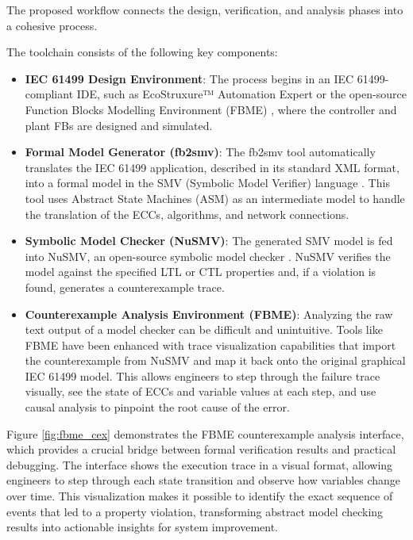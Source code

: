 The proposed workflow connects the design, verification, and analysis phases into a cohesive process.

The toolchain consists of the following key components:

\begin{itemize}
\item \textbf{IEC 61499 Design Environment}: The process begins in an IEC 61499-compliant IDE, such as EcoStruxure™ Automation Expert or the open-source Function Blocks Modelling Environment (FBME) \cite{fbme}, where the controller and plant FBs are designed and simulated.

\item \textbf{Formal Model Generator (fb2smv)}: The fb2smv tool automatically translates the IEC 61499 application, described in its standard XML format, into a formal model in the SMV (Symbolic Model Verifier) language \cite{drozdov2021formal}. This tool uses Abstract State Machines (ASM) as an intermediate model to handle the translation of the ECCs, algorithms, and network connections.

\item \textbf{Symbolic Model Checker (NuSMV)}: The generated SMV model is fed into NuSMV, an open-source symbolic model checker \cite{cimatti2000nusmv}. NuSMV verifies the model against the specified LTL or CTL properties and, if a violation is found, generates a counterexample trace.

\item \textbf{Counterexample Analysis Environment (FBME)}: Analyzing the raw text output of a model checker can be difficult and unintuitive. Tools like FBME have been enhanced with trace visualization capabilities that import the counterexample from NuSMV and map it back onto the original graphical IEC 61499 model. This allows engineers to step through the failure trace visually, see the state of ECCs and variable values at each step, and use causal analysis to pinpoint the root cause of the error.
\end{itemize}

Figure \ref{fig:fbme_cex} demonstrates the FBME counterexample analysis interface, which provides a crucial bridge between formal verification results and practical debugging. The interface shows the execution trace in a visual format, allowing engineers to step through each state transition and observe how variables change over time. This visualization makes it possible to identify the exact sequence of events that led to a property violation, transforming abstract model checking results into actionable insights for system improvement.

